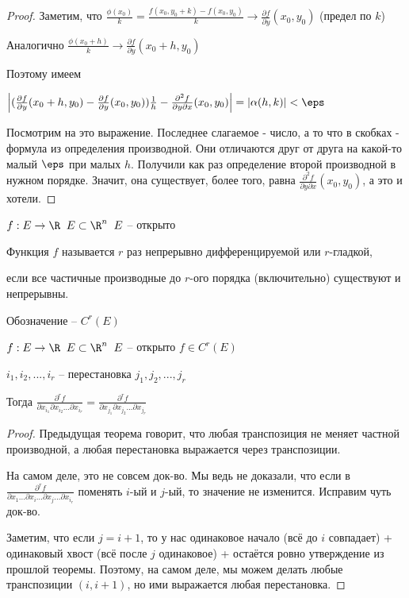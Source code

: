 \begin{proof}
	Заметим, что $\frac{\phi(x_0)}{k} = \frac{f(x_0, y_0 + k) - f(x_0, y_0)}{k}\to \frac{\partial f}{\partial y}(x_0, y_0)$ (предел по $k$)

	Аналогично $\frac{\phi(x_0+h)}{k}\to \frac{\partial f}{\partial y}(x_0+h, y_0)$

	Поэтому имеем

	$\left|(\frac{\partial f}{\partial y}(x_0+h, y_0)-\frac{\partial f}{\partial y}(x_0, y_0))\frac{1}{h} - \frac{\partial^2 f}{\partial y \partial x} (x_0, y_0 )\right|=|\alpha(h, k)|<\eps$

	Посмотрим на это выражение. Последнее слагаемое - число, а то что в скобках - формула из определения производной. Они отличаются друг от друга на какой-то малый $\eps$ при малых $h$. Получили как раз определение второй производной в нужном порядке. Значит, она существует, более того, равна $\frac{\partial^2 f}{\partial y \partial x} (x_0, y_0 )$, а это и хотели.
\end{proof}

\begin{definition}\slashns
	
	$f: E \to \R \;\; E\subset \R^n \;\; E$ -- открыто
	
	Функция $f$ называется $r$ раз непрерывно дифференцируемой или $r$-гладкой,
	
	если все частичные производные до $r$-ого порядка (включительно) существуют и непрерывны.
	
	Обозначение -- $C^r(E)$
\end{definition}

\begin{theorem}\slashns
	
	$f: E \to \R \;\; E \subset \R^n \;\; E$ -- открыто $f \in C^r(E)$
	
	$i_1, i_2, ...,i_r$ -- перестановка $j_1, j_2, ... , j_r$
	
	Тогда $\frac{\partial^r f}{\partial x_{i_1} \partial x_{i_2}...\partial x_{i_r}  } = \frac{\partial^r f}{\partial x_{j_1} \partial x_{j_2}...\partial x_{j_r}  }$
\end{theorem}

\begin{proof}\slashns
	
	Предыдущая теорема говорит, что любая транспозиция не меняет частной производной, а любая перестановка выражается через транспозиции. 

	На самом деле, это не совсем док-во. Мы ведь не доказали, что если в
	$\frac{\partial^r f}{\partial x_1... \partial x_i...\partial x_j...\partial x_{i_r}  }$ поменять $i$-ый и $j$-ый, то значение не изменится. Исправим чуть док-во.

	Заметим, что если $j=i+1$, то у нас одинаковое начало (всё до $i$ совпадает) + одинаковый хвост (всё после $j$ одинаковое) + остаётся ровно утверждение из прошлой теоремы. Поэтому, на самом деле, мы можем делать любые транспозиции $(i, i+1)$, но ими выражается любая перестановка.
\end{proof}

